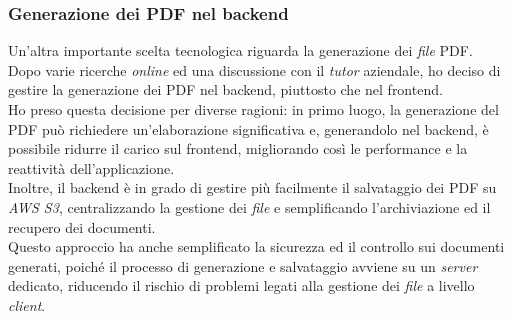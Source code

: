 \subsubsection{Generazione dei PDF nel \gls{backend}}

Un'altra importante scelta tecnologica riguarda la generazione dei \textit{file} PDF.\\
Dopo varie ricerche \textit{online} ed una discussione con il \textit{tutor} aziendale, ho deciso di gestire la generazione dei PDF nel \gls{backend}, piuttosto che nel \gls{frontend}.\\

\noindent Ho preso questa decisione per diverse ragioni: in primo luogo, la generazione del PDF può richiedere un'elaborazione significativa e, generandolo nel \gls{backend}, è possibile ridurre il carico sul \gls{frontend}, migliorando così le performance e la reattività dell'applicazione.\\
Inoltre, il \gls{backend} è in grado di gestire più facilmente il salvataggio dei PDF su \textit{AWS S3}, centralizzando la gestione dei \textit{file} e semplificando l'archiviazione ed il recupero dei documenti.\\

\noindent Questo approccio ha anche semplificato la sicurezza ed il controllo sui documenti generati, poiché il processo di generazione e salvataggio avviene su un \textit{server} dedicato, riducendo il rischio di problemi legati alla gestione dei \textit{file} a livello \textit{client}.
